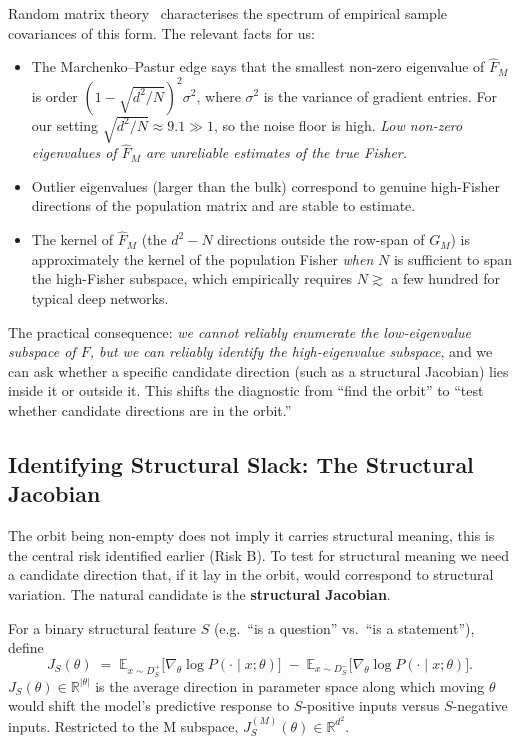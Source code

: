 \documentclass[11pt, a4paper]{article}
\theoremstyle{plain}
\theoremstyle{definition}
\theoremstyle{remark}
\begin{document}
Random matrix theory~\cite{sagun2016eigenvalues, papyan2019measurements} characterises the spectrum of empirical sample covariances of this form.
The relevant facts for us:
\begin{itemize}[nosep]
\item The Marchenko--Pastur edge says that the smallest non-zero eigenvalue of $\hat{F}_M$ is order $(1 - \sqrt{d^{2}/N})^{2} \sigma^{2}$, where $\sigma^{2}$ is the variance of gradient entries. For our setting $\sqrt{d^{2}/N} \approx 9.1 \gg 1$, so the noise floor is high. \emph{Low non-zero eigenvalues of $\hat{F}_M$ are unreliable estimates of the true Fisher.}
\item Outlier eigenvalues (larger than the bulk) correspond to genuine high-Fisher directions of the population matrix and are stable to estimate.
\item The kernel of $\hat{F}_M$ (the $d^{2} - N$ directions outside the row-span of $G_M$) is approximately the kernel of the population Fisher \emph{when} $N$ is sufficient to span the high-Fisher subspace, which empirically requires $N \gtrsim$ a few hundred for typical deep networks.
\end{itemize}

The practical consequence: \emph{we cannot reliably enumerate the low-eigenvalue subspace of $F$, but we can reliably identify the high-eigenvalue subspace}, and we can ask whether a specific candidate direction (such as a structural Jacobian) lies inside it or outside it.
This shifts the diagnostic from ``find the orbit'' to ``test whether candidate directions are in the orbit.''

\subsection{Identifying Structural Slack: The Structural Jacobian}

The orbit being non-empty does not imply it carries structural meaning, this is the central risk identified earlier (Risk B).
To test for structural meaning we need a candidate direction that, if it lay in the orbit, would correspond to structural variation.
The natural candidate is the \textbf{structural Jacobian}.

For a binary structural feature $S$ (e.g.\ ``is a question'' vs.\ ``is a statement''), define
\begin{equation}
J_S(\theta) \;=\; \mathbb{E}_{x \sim D_S^{+}}\!\big[\nabla_\theta \log P(\cdot \mid x; \theta)\big] \;-\; \mathbb{E}_{x \sim D_S^{-}}\!\big[\nabla_\theta \log P(\cdot \mid x; \theta)\big].
\end{equation}
$J_S(\theta) \in \mathbb{R}^{|\theta|}$ is the average direction in parameter space along which moving $\theta$ would shift the model's predictive response to $S$-positive inputs versus $S$-negative inputs.
Restricted to the M subspace, $J_S^{(M)}(\theta) \in \mathbb{R}^{d^{2}}$.
\end{document}

